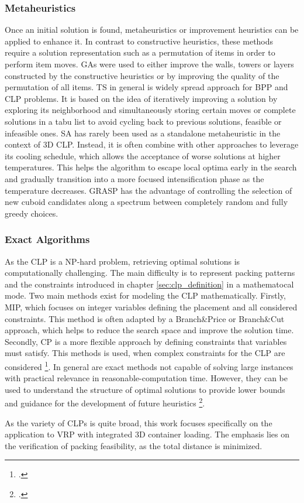 \subsubsection{Metaheuristics}
Once an initial solution is found, metaheuristics or improvement heuristics can be applied
to enhance it. In contrast to constructive heuristics, these methods require a solution
representation such as a permutation of items in order to perform item moves. \gls{GA}s were
used to either improve the walls, towers or layers constructed by the constructive heuristics
or by improving the quality of the permutation of all items.
\gls{TS} in general is widely spread approach for \gls{BPP} and \gls{CLP} problems. It is based on
the idea of iteratively improving a solution by exploring its neighborhood and simultaneously
storing certain moves or complete solutions in a tabu list to avoid cycling back to
previous solutions, feasible or infeasible ones. \gls{SA} has rarely been used as a
standalone metaheuristic in the context of \gls{3D} \gls{CLP}. Instead, it is often combine
with other approaches to leverage its cooling schedule, which allows the acceptance of
worse solutions at higher temperatures. This helps the algorithm to escape local optima
early in the search and gradually transition into a more focused intensification phase as
the temperature decreases. \gls{GRASP} has the advantage of controlling the selection of new
cuboid candidates along a spectrum between completely random and fully greedy choices.

\subsubsection{Exact Algorithms}
As the \gls{CLP} is a NP-hard problem, retrieving optimal solutions is computationally
challenging. The main difficulty is to represent packing patterns and the constraints
introduced in chapter \ref{sec:clp_definition} in a mathematocal mode. Two main methods
exist for modeling the \gls{CLP} mathematically. Firstly, \gls{MIP}, which focuses on
integer variables defining the placement and all considered constraints. This method is
often adapted by a Branch\&Price or Branch\&Cut approach, which helps to reduce the
search space and improve the solution time. Secondly, \gls{CP} is a more flexible
approach by defining constraints that variables must satisfy. This methods is used, when
complex constraints for the \gls{CLP} are considered \footcite[cf.][p. 7--11]{tamke_branch-and-cut_2024}.
In general are exact methods not capable of solving large instances with practical relevance
in reasonable-computation time. However, they can be used to understand the structure
of optimal solutions to provide lower bounds and guidance for the development of future
heuristics \footcite[cf.][p.2]{tamke_branch-and-cut_2024}.




As the variety of \gls{CLP}s is quite broad, this work focuses specifically on
the application to \gls{VRP} with integrated \gls{3D} container loading. The emphasis lies
on the verification of packing feasibility, as the total distance is minimized.